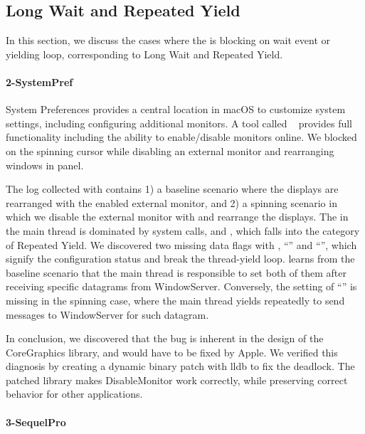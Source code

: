 \subsection{Long Wait and Repeated Yield}

In this section, we discuss the cases where the \spinningnode is blocking on
wait event or yielding loop, corresponding to Long Wait and Repeated Yield.

\paragraph{2-SystemPref}

System Preferences provides a central location in macOS to customize system
settings, including configuring additional monitors. A tool called
~\cite{disablemonitor} provides full functionality including
the ability to enable/disable monitors online. We blocked on the spinning
cursor while disabling an external monitor and rearranging windows in
 panel.

The log collected with \xxx contains 1) a baseline scenario where the displays
are rearranged with the enabled external monitor, and 2) a spinning scenario in
which we disable the external monitor with  and rearrange
the displays. The \spinningnode in the main thread is dominated by system
calls,  and , which falls into the category of
Repeated Yield. We discovered two missing data flags with ,
``'' and ``'', which
signify the configuration status and break the thread-yield loop. \xxx learns
from the baseline scenario that the main thread is responsible to set both of
them after receiving specific datagrams from WindowServer. Conversely, the
setting of ``'' is missing in the spinning case,
where the main thread yields repeatedly to send messages to WindowServer for
such datagram.

In conclusion, we discovered that the bug is inherent in the design of the
CoreGraphics library, and would have to be fixed by Apple. We verified this
diagnosis by creating a dynamic binary patch with lldb to fix the deadlock. The
patched library makes DisableMonitor work correctly, while preserving correct
behavior for other applications.

\paragraph{3-SequelPro}

